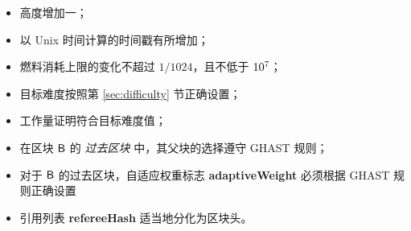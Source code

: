 \begin{itemize}[nosep]
	\item 高度增加一；
	\item 以 Unix 时间计算的时间戳有所增加；

	\item 燃料消耗上限的变化不超过 $1/1024$，且不低于 $10^7$；

	\item 目标难度按照第 \ref{sec:difficulty} 节正确设置；

	\item 工作量证明符合目标难度值；


	\item 在区块 $\textsf{B}$ 的 \emph{过去区块} 中，其父块的选择遵守 GHAST 规则\cite{GHOST}；

	\item 对于 $\textsf{B}$ 的过去区块，自适应权重标志 {\bf adaptiveWeight} 必须根据 GHAST 规则正确设置




	\item 引用列表 {\bf refereeHash} 适当地分化为区块头。

\end{itemize}

